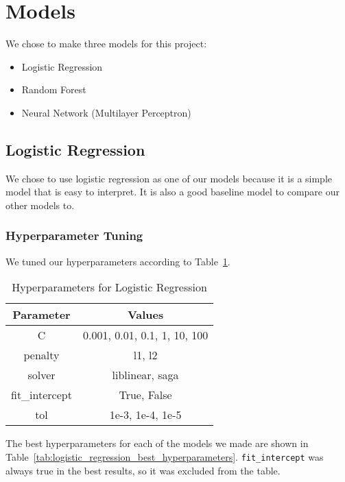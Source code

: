 \documentclass[12pt,twocolumn]{article}
\begin{document}
\section{Models}
We chose to make three models for this project:
\begin{itemize}
    \item Logistic Regression
    \item Random Forest
    \item Neural Network (Multilayer Perceptron)
\end{itemize}

\subsection{Logistic Regression}

We chose to use logistic regression as one of our models because it is a simple model that is easy to interpret. It is also a good baseline model to compare our other models to. 
\subsubsection{Hyperparameter Tuning}
We tuned our hyperparameters according to Table~\ref{tab:logistic_regression_hyperparameters}. 
\begin{table}
    \centering
    \begin{tabular}{|c|c|}
        \hline
        Parameter & Values \\
        \hline
        \hline
        C & 0.001, 0.01, 0.1, 1, 10, 100 \\
        \hline
        penalty & l1, l2 \\
        \hline
        solver & liblinear, saga \\
        \hline
        fit\_intercept & True, False \\
        \hline
        tol & 1e-3, 1e-4, 1e-5 \\
        \hline
    \end{tabular}
    \caption{Hyperparameters for Logistic Regression}\label{tab:logistic_regression_hyperparameters}
\end{table}

The best hyperparameters for each of the models we made are shown in Table~\ref{tab:logistic_regression_best_hyperparameters}. \texttt{fit\_intercept} was always true in the best results, so it was excluded from the table.
\end{document}
